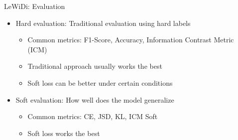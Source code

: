 \begin{frame}{LeWiDi: Evaluation}
    \begin{itemize}
        \item Hard evaluation: Traditional evaluation using hard labels
        \begin{itemize}
            \item Common metrics: F1-Score, Accuracy, Information Contrast Metric (ICM)
            \item Traditional approach usually works the best
            \item Soft loss can be better under certain conditions
        \end{itemize}
        \item Soft evaluation: How well does the model generalize
        \begin{itemize}
            \item Common metrics: CE, JSD, KL, ICM Soft
            \item Soft loss works the best
        \end{itemize}
    \end{itemize}
\end{frame}